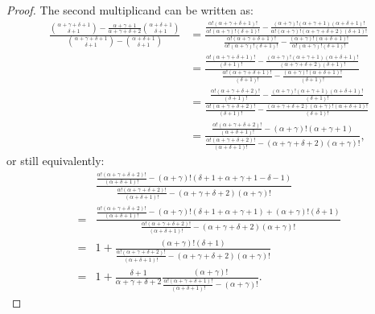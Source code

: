 \documentclass[version=3.21, pagesize, twoside=off, bibliography=totoc, DIV=calc, fontsize=12pt, a4paper]{scrartcl}
\begin{document}
\begin{proof}
	The second multiplicand can be written as:
	\begin{align}
		\frac{
			\binom{\alpha + \gamma + \delta + 1}{\delta + 1} - \frac{\alpha + \gamma + 1}{\alpha + \gamma + \delta + 2} \binom{\alpha + \delta + 1}{\delta + 1}
		}{
			\binom{\alpha + \gamma + \delta + 1}{\delta + 1} - \binom{\alpha + \delta + 1}{\delta + 1}
		}
		& = \frac{
			\frac{\alpha! (\alpha + \gamma + \delta + 1)!}{\alpha ! (\alpha + \gamma)! (\delta + 1)!} - \frac{(\alpha + \gamma)! (\alpha + \gamma + 1) (\alpha + \delta + 1)!}{\alpha! (\alpha + \gamma)! (\alpha + \gamma + \delta + 2) (\delta + 1)!}
		}{
			\frac{\alpha! (\alpha + \gamma + \delta + 1)!}{\alpha ! (\alpha + \gamma)! (\delta + 1)!} - \frac{(\alpha + \gamma)! (\alpha + \delta + 1)!}{\alpha! (\alpha + \gamma)! (\delta + 1)!}
		}\\
		& = \frac{
			\frac{\alpha! (\alpha + \gamma + \delta + 1)!}{(\delta + 1)!} - \frac{(\alpha + \gamma)! (\alpha + \gamma + 1) (\alpha + \delta + 1)!}{(\alpha + \gamma + \delta + 2) (\delta + 1)!}
		}{
			\frac{\alpha! (\alpha + \gamma + \delta + 1)!}{(\delta + 1)!} - \frac{(\alpha + \gamma)! (\alpha + \delta + 1)!}{(\delta + 1)!}
		}\\
		& = \frac{
			\frac{\alpha! (\alpha + \gamma + \delta + 2)!}{(\delta + 1)!} - \frac{(\alpha + \gamma)! (\alpha + \gamma + 1) (\alpha + \delta + 1)!}{(\delta + 1)!}
		}{
			\frac{\alpha! (\alpha + \gamma + \delta + 2)!}{(\delta + 1)!} - \frac{(\alpha + \gamma + \delta + 2) (\alpha + \gamma)! (\alpha + \delta + 1)!}{(\delta + 1)!}
		}\\
		& = \frac{
			\frac{\alpha! (\alpha + \gamma + \delta + 2)!}{(\alpha + \delta + 1)!} - (\alpha + \gamma)! (\alpha + \gamma + 1)
		}{
			\frac{\alpha! (\alpha + \gamma + \delta + 2)!}{(\alpha + \delta + 1)!} - (\alpha + \gamma + \delta + 2) (\alpha + \gamma)!
		},
	\end{align}
	or still equivalently:
	\begin{align}
	& \frac{
			\frac{\alpha! (\alpha + \gamma + \delta + 2)!}{(\alpha + \delta + 1)!} - (\alpha + \gamma)! (\delta + 1 + \alpha + \gamma + 1 - \delta - 1)
		}{
			\frac{\alpha! (\alpha + \gamma + \delta + 2)!}{(\alpha + \delta + 1)!} - (\alpha + \gamma + \delta + 2) (\alpha + \gamma)!
		}\\
	= & \frac{
			\frac{\alpha! (\alpha + \gamma + \delta + 2)!}{(\alpha + \delta + 1)!} - (\alpha + \gamma)! (\delta + 1 + \alpha + \gamma + 1) + (\alpha + \gamma)! (\delta + 1) 
		}{
			\frac{\alpha! (\alpha + \gamma + \delta + 2)!}{(\alpha + \delta + 1)!} - (\alpha + \gamma + \delta + 2) (\alpha + \gamma)!
		}\\
	= & 1 + \frac{
			(\alpha + \gamma)! (\delta + 1) 
		}{
			\frac{\alpha! (\alpha + \gamma + \delta + 2)!}{(\alpha + \delta + 1)!} - (\alpha + \gamma + \delta + 2) (\alpha + \gamma)!
		}\\
	= & 1 + \frac{\delta + 1}{\alpha + \gamma + \delta + 2}
		\frac{
			(\alpha + \gamma)! 
		}{
			\frac{\alpha! (\alpha + \gamma + \delta + 1)!}{(\alpha + \delta + 1)!} - (\alpha + \gamma)!
		}.
	\end{align}
\end{proof}
\end{document}

